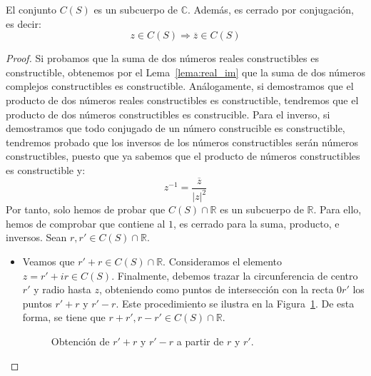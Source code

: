 \begin{prop}
    El conjunto $C(S)$ es un subcuerpo de $\mathbb{C}$. Además, es cerrado por conjugación, es decir:
    \begin{equation*}
        z\in C(S) \Longrightarrow \overline{z}\in C(S)
    \end{equation*}
    \begin{proof}
        Si probamos que la suma de dos números reales constructibles es constructible, obtenemos por el Lema~\ref{lema:real_im} que la suma de dos números complejos constructibles es constructible. Análogamente, si demostramos que el producto de dos números reales constructibles es constructible, tendremos que el producto de dos números constructibles es construcible. Para el inverso, si demostramos que todo conjugado de un número construcible es constructible, tendremos probado que los inversos de los números constructibles serán números constructibles, puesto que ya sabemos que el producto de números constructibles es constructible y:
        \begin{equation*}
            z^{-1} = \dfrac{\overline{z}}{{|z|}^{2}}
        \end{equation*}
        Por tanto, solo hemos de probar que $C(S)\cap \mathbb{R}$ es un subcuerpo de $\mathbb{R}$. Para ello, hemos de comprobar que contiene al $1$, es cerrado para la suma, producto, e inversos. Sean $r,r'\in C(S)\cap \mathbb{R}$.
\begin{itemize}
    \item Veamos que $r'+r \in C(S)\cap \mathbb{R}$. Consideramos el elemento $z=r'+ir\in C(S)$. Finalmente, debemos trazar la circunferencia de centro $r'$ y radio hasta $z$, obteniendo como puntos de intersección con la recta $0r'$ los puntos $r'+r$ y $r'-r$. Este procedimiento se ilustra en la Figura~\ref{fig:sumas_reales}. De esta forma, se tiene que $r+r',r-r'\in C(S)\cap \mathbb{R}$.
        \begin{figure}[h]
            \centering
            \caption{Obtención de $r'+r$ y $r'-r$ a partir de $r$ y $r'$.}
            \label{fig:sumas_reales}
        \end{figure}


\end{itemize}
\end{proof}
\end{prop}
